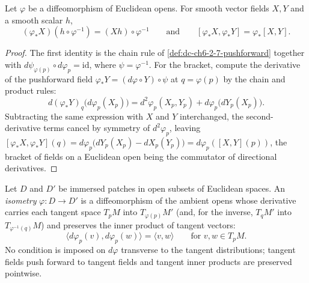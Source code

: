 \begin{lemma}
  \label{lem:dc-ch6-2-7-pushforward-naturality}
  \leanok
  Let $\varphi$ be a diffeomorphism of Euclidean opens. For smooth vector
  fields $X,Y$ and a smooth scalar $h$,
  $$
  (\varphi_*X)(h\circ\varphi^{-1})=(Xh)\circ\varphi^{-1}
  \qquad\text{and}\qquad
  [\varphi_*X,\varphi_*Y]=\varphi_*[X,Y].
  $$
\end{lemma}
\begin{proof}
  \leanok
  \sketch
  The first identity is the chain rule of \cref{def:dc-ch6-2-7-pushforward}
  together with $d\psi_{\varphi(p)}\circ d\varphi_p=\mathrm{id}$, where
  $\psi=\varphi^{-1}$. For the bracket, compute the derivative of the
  pushforward field $\varphi_*Y=(d\varphi\circ Y)\circ\psi$ at
  $q=\varphi(p)$ by the chain and product rules:
  $$
  d(\varphi_*Y)_q\bigl(d\varphi_p(X_p)\bigr)
    = d^2\varphi_p(X_p,Y_p)+d\varphi_p\bigl(dY_p(X_p)\bigr).
  $$
  Subtracting the same expression with $X$ and $Y$ interchanged, the
  second-derivative terms cancel by symmetry of $d^2\varphi_p$,
  leaving
  $[\varphi_*X,\varphi_*Y](q)
    =d\varphi_p\bigl(dY_p(X_p)-dX_p(Y_p)\bigr)=d\varphi_p([X,Y](p))$,
  the bracket of fields on a Euclidean open being the commutator of directional
  derivatives.
\end{proof}

\begin{definition}
  \label{def:dc-ch6-2-7-isometry}
  \leanok
  Let $D$ and $D'$ be immersed patches in open subsets of Euclidean spaces. An
  \emph{isometry} $\varphi:D\to D'$ is a diffeomorphism of the ambient opens
  whose derivative carries each tangent space $T_pM$ into
  $T_{\varphi(p)}M'$ (and, for the inverse, $T_qM'$ into
  $T_{\varphi^{-1}(q)}M$) and preserves the inner product of tangent vectors:
  $$
  \langle d\varphi_p(v),d\varphi_p(w)\rangle=\langle v,w\rangle
  \qquad\text{for } v,w\in T_pM.
  $$
  No condition is imposed on $d\varphi$ transverse to the tangent distributions;
  tangent fields push forward to tangent fields and tangent inner products are
  preserved pointwise.
\end{definition}

